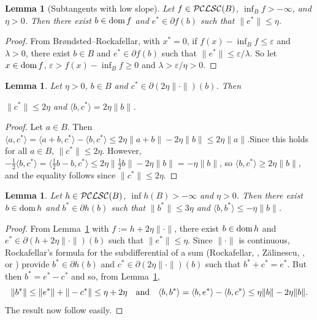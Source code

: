\documentclass[letterpaper]{article}
\theoremstyle{plain}
\newtheorem{lemma}[theorem]{Lemma}
\theoremstyle{definition}
\numberwithin{equation}{section}
\newcommand{\bra}[2]{\langle#1,#2\rangle}
\newcommand{\dom}{\hbox{\rm dom}}
\newcommand{\eps}{\varepsilon}
\newcommand{\half}{{\textstyle\frac{1}{2}}}
\newcommand{\PCLSC}{{\cal PCLSC}}
\newcommand{\quand}{\quad\hbox{and}\quad}
\newcommand{\Lem}{Lemma~\ref}
\begin{document}
\begin{lemma}[Subtangents with low slope]\label{ALHORlem}
Let $f \in \PCLSC(B)$, $\inf_Bf > -\infty$, and $\eta > 0$. Then there exist $b \in \dom\,f$ and $e^* \in \partial f(b)$ such that $\|e^*\| \le \eta$.
\end{lemma}
%
\begin{proof}
From Br\o ndsted--Rockafellar, \cite[Lemma, pp.\ 608--609]{BRON} with $x^* = 0$, if $f(x) - \inf_Bf \le \eps$ and $\lambda > 0$, there exist $b \in B$ and $e^* \in \partial f(b)$ such that  $\|e^*\| \le \eps/\lambda$.   So let $x \in \dom\,f$, $\eps > f(x) - \inf_Bf \ge 0$ and $\lambda > \eps/\eta > 0$. 
\end{proof}


\begin{lemma}\label{NORMlem}
Let $\eta > 0$, $b \in B$ and $c^* \in \partial(2\eta\|\cdot\|)(b)$. Then
\smallbreak
\centerline{ $\|c^*\| \le 2\eta$ and $\bra{b}{c^*} = 2\eta\|b\|$.}
\end{lemma}
\begin{proof}
Let $a \in B$.  Then\quad $\bra{a}{c^*} = \bra{a + b}{c^*} - \bra{b}{c^*} \le 2\eta\|a + b\| - 2\eta\|b\| \le 2\eta\|a \|$.\quad Since this holds for all $a \in B$, $\|c^*\| \le 2\eta$.   However, $-\half\bra{b}{c^*} = \bra{\half b - b}{c^*} \le 2\eta\|\half b\| - 2\eta\|b\| = - \eta\|b\|$, so $\bra{b}{c^*} \ge 2\eta\|b\|$, and the equality follows since $\|c^*\| \le 2\eta$. 
\end{proof}
\begin{lemma}\label{hlem}
Let $h \in \PCLSC(B)$, $\inf h(B) > -\infty$ and $\eta > 0$.   Then there exist $b \in \dom\,h$ and $b^* \in \partial h(b)$ such that $\|b^*\| \le 3\eta$ and $\bra{b}{b^*} \le -\eta\|b\|$.  
\end{lemma}
\begin{proof}
From \Lem{ALHORlem} with $f:= h + 2\eta\|\cdot\|$, there exist $b \in \dom\,h$ and $e^* \in \partial (h + 2\eta\|\cdot\|)(b)$ such that $\|e^*\| \le \eta$.   Since $\|\cdot\|$ is continuous, Rockafellar's formula for the subdifferential of a sum \big(Rockafellar, \cite[Theorem 3(b), p.\ 85]{FENCHEL}, Z\u alinescu, \cite[Theorem 2.8.7(iii), p.\ 127]{ZBOOK}, or \cite[Theorem 18.1, pp.\ 74--75]{HBM}\big) provide $b^* \in \partial h(b)$ and $c^* \in \partial(2\eta\|\cdot\|)(b)$ such that $b^* + c^* = e^*$.   But then $b^* = e^* - c^*$ and so, from \Lem{NORMlem},
%
\begin{equation*}
\|b^*\| \le \|e^*\| + \|-c^*\| \le \eta + 2\eta \quand \bra{b}{b^*} = \bra{b}{e^*} - \bra{b}{c^*} \le \eta\|b\| - 2\eta\|b\|.
\end{equation*}
%
The result now follow easily.  
\end{proof}
\end{document}
